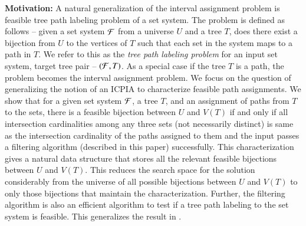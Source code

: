 \documentclass[MS,synopsis]{iitmdiss}
\begin{document}



{\bf Motivation: } A natural generalization of the interval assignment problem is
feasible tree path labeling problem of a set system. The problem is
defined as follows -- given a set system ${\cal F}$ from a universe $U$ and
a tree $T$, does there exist a bijection from $U$ to the vertices of
$T$ such that each set in the system maps to a path in $T$.  We refer
to this as the {\em tree path labeling problem} for an input set
system, target tree pair -- $({\cal F},T)$. As a special case if the tree
$T$ is a path, the problem becomes the interval assignment problem.
We focus on the question of generalizing the notion of an ICPIA
\cite{nsnrs09} to characterize feasible path assignments.  We show
that for a given set system ${\cal F}$, a tree $T$, and an assignment of
paths from $T$ to the sets, there is a feasible bijection between $U$
and $V(T)$ if and only if all intersection cardinalities among any
three sets (not necessarily distinct) is same as the intersection
cardinality of the paths assigned to them and the input passes a
filtering algorithm (described in this paper) successfully.  This
characterization gives a natural data structure that stores all the
relevant feasible bijections between $U$ and $V(T)$. This reduces the
search space for the solution considerably from the universe of all
possible bijections between $U$ and $V(T)$ to only those bijections
that maintain the characterization.  Further, the
filtering algorithm is also an efficient algorithm to test if a tree
path labeling to the set system is feasible.  This generalizes the
result in \cite{nsnrs09}.
\end{document}
